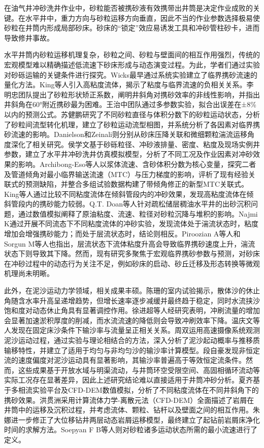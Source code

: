 
在油气井冲砂洗井作业中，砂粒能否被携砂液有效携带出井筒是决定作业成败的关键。在水平井中，重力方向与砂粒运移方向垂直，因此不当的作业参数选择极易使砂粒在井筒内形成局部砂床。砂床的“锁定”效应易诱发工具和冲砂管柱砂卡，进而导致修井事故。

水平井筒内砂粒运移机理复杂，砂粒之间、砂粒与壁面间的相互作用强烈，传统的宏观模型难以精确描述低流速下砂床形成与动态演变过程。为此，学者们通过实验对砂砾运输的关键条件进行探究。Wicks最早通过系统实验建立了临界携砂流速的量化方法\cite{ref1}。King等人引入高粘度流体，揭示了粘度与临界流速的负相关关系\cite{ref2}。李明忠团队提出了砂粒形状矫正系数，阐明井斜角对携砂效率的非线性影响，并指出井斜角在60°附近携砂最为困难\cite{ref3,ref4}。王治中团队通过多参数实验，拟合出误差在±8\%以内的预测公式\cite{ref5}。苏健鹏研究了不同砂粒直径与体积分数下的砂粒运动状态，分析了砂粒间流型转化机理，建立了砂粒运动流型相图，并系统分析了各因素对临界携砂流速的影响\cite{ref6}。Danielson和Zeinali则分别从砂床压降关联和微细颗粒湍流运移角度深化了相关研究\cite{ref7,ref8}。侯学文基于砂砾粒径、冲砂液排量、密度、粘度及现场实例井参数，建立了水平井冲砂洗井仿真模拟模型，分析了不同工况及作业因素对冲砂效果的影响\cite{ref9}。Archibong-Eso等人以浆体流速、含砂体积分数为核心变量，探究二者及管道倾角对最小临界输送流速（MTC）与压力梯度的影响，评析了现有经验关联式的预测缺陷，并整合多组试验数据构建了带倾角修正的新型MTC关联式\cite{ref10}。King等人通过比较不同粘度流体在倾斜管段内的冲砂效果，发现高粘度流体在倾斜管段内的携砂能力较弱\cite{ref2}。Q.T. Doan等人针对疏松储层稠油水平井的出砂沉积问题，通过数值模拟阐释了原油粘度、流速、粒径对砂粒沉降与堆积的影响\cite{ref11}。Najmi K通过开展不同流态下不同粘度流体的冲砂实验，发现流体处于湍流状态时，粘度增加会增强携砂能力；而处于层流状态时，结论则相反\cite{ref12}。Piroozian A等人\cite{ref13}和Sorgun M等人也指出\cite{ref14}，层流状态下流体粘度升高会导致临界携砂速度上升，湍流状态下则导致其下降。然而，现有研究多聚焦于宏观临界携砂参数与预测，对砂床在冲砂过程中的动态行为关注不足，例如砂床的启动、砂丘迁移及形态转换等微观机理尚未明晰。

此外，在泥沙运动力学领域，相关成果丰硕。陈珊的室内试验揭示，散体沙的休止角随含水率升高呈递增趋势，但增长速率逐步减缓并最终趋于稳定，同时水流挟沙饱和度对动态休止角具有显著调控作用\cite{ref15}。徐进超等人经研究表明，冲刷流量的增加会显著加速淤积厚度的削减，而水流流速的降低则会导致冲刷效率下降\cite{ref16}。温庆文等人发现在固定床沙条件下输沙率与流量呈正相关关系\cite{ref17}。周双运用高速摄像系统观测泥沙运动过程，通过实验与理论相结合的方法，深入分析了泥沙起动概率与推移质输移特性，并建立了适用于均匀与非均匀沙的输沙率计算模型\cite{ref18}。段自豪发现非恒定流的速度偏度对泥沙运动具有显著影响，其输沙率普遍高于等效恒定流条件\cite{ref19}。然而，这些成果基于开放水域与明渠流动，与井筒环空受限空间、高固相循环流动等实际工况存在显著差异，因此上述研究结论难以直接适用于井筒冲砂分析\cite{ref20}。夏齐基于多相流实验平台及CFD-DEM数值模拟，分析了不同粘度流体在不同井斜角下的携砂效果\cite{ref21}。洪贯洲采用计算流体力学-离散元法（CFD-DEM）全面描述了岩屑在井筒中的运移及沉积过程，并考虑流体、颗粒、钻杆以及壁面之间的相互作用\cite{ref22}。朱娜进一步修正了大位移钻井两层动态岩屑运移模型，最终建立了起钻前岩屑床净化时间的求解方法\cite{ref23}。Soepyan F B等人则对砂粒诸多运动状态所需的最小流速进行了定义\cite{ref24}。

